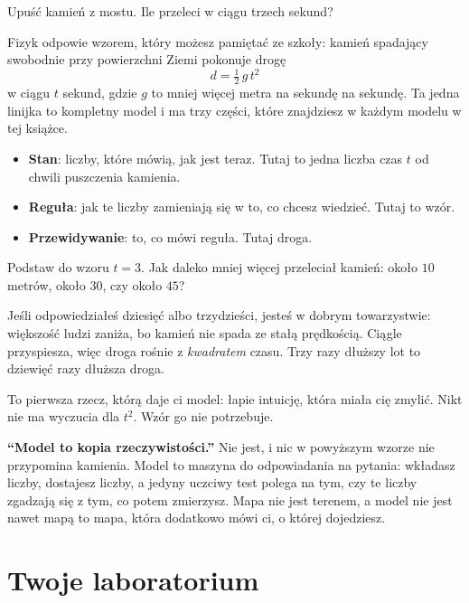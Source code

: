 \noindent
Upuść kamień z mostu. Ile przeleci w ciągu trzech sekund?

Fizyk odpowie wzorem, który możesz pamiętać ze szkoły: kamień spadający
swobodnie przy powierzchni Ziemi pokonuje drogę
\[ d = \tfrac{1}{2}\, g\, t^{2} \]
w ciągu $t$ sekund, gdzie $g$ to mniej więcej  metra na sekundę
na sekundę. Ta jedna linijka to kompletny model i ma trzy części, które
znajdziesz w każdym modelu w tej książce.

\begin{itemize}
\item \textbf{Stan}: liczby, które mówią, jak jest teraz. Tutaj to jedna
  liczba \dash{} czas $t$ od chwili puszczenia kamienia.
\item \textbf{Reguła}: jak te liczby zamieniają się w to, co chcesz wiedzieć.
  Tutaj to wzór.
\item \textbf{Przewidywanie}: to, co mówi reguła. Tutaj \dash{} droga.
\end{itemize}

\begin{think}
Podstaw do wzoru $t = 3$. Jak daleko mniej więcej przeleciał kamień: około
$10$ metrów, około $30$, czy około $45$?
\end{think}
Jeśli odpowiedziałeś dziesięć albo trzydzieści, jesteś w dobrym
towarzystwie: większość ludzi zaniża, bo kamień nie spada ze stałą
prędkością. Ciągle przyspiesza, więc droga rośnie z \emph{kwadratem} czasu.
Trzy razy dłuższy lot to dziewięć razy dłuższa droga.

To pierwsza rzecz, którą daje ci model: łapie intuicję, która miała cię
zmylić. Nikt nie ma wyczucia dla $t^{2}$. Wzór go nie potrzebuje.

\begin{trapbox}
\textbf{\enquote{Model to kopia rzeczywistości.}} Nie jest, i nic w
powyższym wzorze nie przypomina kamienia. Model to maszyna do odpowiadania
na pytania: wkładasz liczby, dostajesz liczby, a jedyny uczciwy test polega
na tym, czy te liczby zgadzają się z tym, co potem zmierzysz. Mapa nie jest
terenem, a model nie jest nawet mapą \dash{} to mapa, która dodatkowo mówi
ci, o której dojedziesz.
\end{trapbox}

\section{Twoje laboratorium}
\label{sec:ch01-lab}

